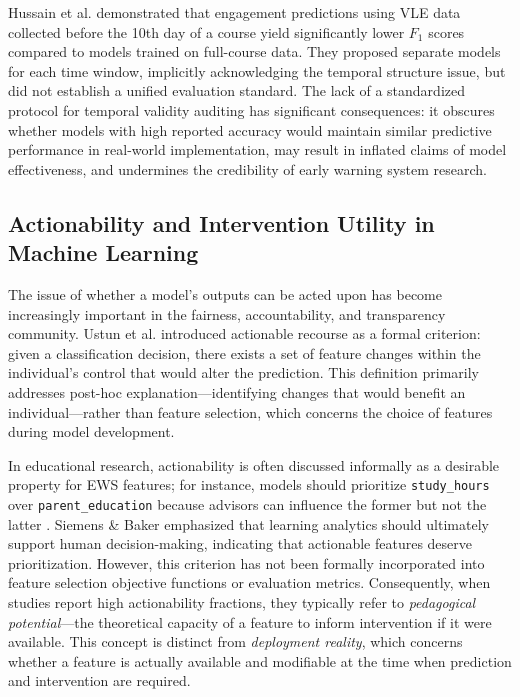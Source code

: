 \documentclass[a4paper,fleqn]{cas-sc}
\begin{document}
Hussain et al. \cite{hussain2018} demonstrated that engagement predictions using VLE data collected before the 10th day of a course yield significantly lower $F_1$ scores compared to models trained on full-course data. They proposed separate models for each time window, implicitly acknowledging the temporal structure issue, but did not establish a unified evaluation standard. The lack of a standardized protocol for temporal validity auditing has significant consequences: it obscures whether models with high reported accuracy would maintain similar predictive performance in real-world implementation, may result in inflated claims of model effectiveness, and undermines the credibility of early warning system research.

\subsection{Actionability and Intervention Utility in Machine Learning}
The issue of whether a model's outputs can be acted upon has become increasingly important in the fairness, accountability, and transparency community. Ustun et al. \cite{ustun2019} introduced actionable recourse as a formal criterion: given a classification decision, there exists a set of feature changes within the individual's control that would alter the prediction. This definition primarily addresses post-hoc explanation---identifying changes that would benefit an individual---rather than feature selection, which concerns the choice of features during model development.

In educational research, actionability is often discussed informally as a desirable property for EWS features; for instance, models should prioritize \texttt{study\_hours} over \texttt{parent\_education} because advisors can influence the former but not the latter \cite{baker2014}. Siemens \& Baker \cite{siemens2012} emphasized that learning analytics should ultimately support human decision-making, indicating that actionable features deserve prioritization. However, this criterion has not been formally incorporated into feature selection objective functions or evaluation metrics. Consequently, when studies report high actionability fractions, they typically refer to \textit{pedagogical potential}---the theoretical capacity of a feature to inform intervention if it were available. This concept is distinct from \textit{deployment reality}, which concerns whether a feature is actually available and modifiable at the time when prediction and intervention are required.
\end{document}
